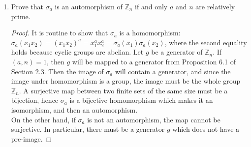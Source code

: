 \documentclass{article}
\begin{document}
\begin{enumerate}
\begin{enumerate}
        \begin{enumerate}
          \item Prove that $\sigma_a$ is an automorphism of $\mathbb{Z}_n$
            if and only $a$ and $n$ are relatively prime.
            \begin{proof}
              It is routine to show that $\sigma_a$ is a homomorphism:
              $\sigma_a(x_1x_2)=(x_1x_2)^a=x_1^ax_2^a=\sigma_a(x_1)\sigma_a(x_2)$,
              where the second equality holds because cyclic groups are
              abelian. Let $g$ be a generator of $\mathbb{Z}_n$. If
              $(a,n)=1$, then $g$ will be mapped to a generator from
              Proposition 6.1 of Section 2.3. Then the image of $\sigma_a$
              will contain a generator, and since the image under
              homomorphism is a group, the image must be the whole group
              $\mathbb{Z}_n$. A surjective map between two finite sets of the
              same size must be a bijection, hence $\sigma_a$ is a
              bijective homomorphism which makes it an isomorphism, and
              then an automorphism. \\

              On the other hand, if $\sigma_a$ is not an automorphism, the
              map cannot be surjective. In particular, there must be a
              generator $g$ which does not have a pre-image.
            \end{proof}
        \end{enumerate}
    \end{enumerate}


\end{enumerate}
\end{document}
